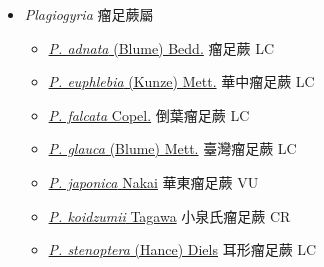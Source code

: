 
  \begin{itemize}
 \item[    ] \textit{Plagiogyria} 瘤足蕨屬
                                
  \begin{itemize}
        \item[] \href{http://www.theplantlist.org/tpl1.1/search?q=Plagiogyria+adnata}{\textit{P. adnata} (Blume) Bedd.}   瘤足蕨   LC
        \item[] \href{http://www.theplantlist.org/tpl1.1/search?q=Plagiogyria+euphlebia}{\textit{P. euphlebia} (Kunze) Mett.}   華中瘤足蕨   LC
        \item[] \href{http://www.theplantlist.org/tpl1.1/search?q=Plagiogyria+falcata}{\textit{P. falcata} Copel.}   倒葉瘤足蕨   LC
        \item[] \href{http://www.theplantlist.org/tpl1.1/search?q=Plagiogyria+glauca}{\textit{P. glauca} (Blume) Mett.}   臺灣瘤足蕨   LC
        \item[] \href{http://www.theplantlist.org/tpl1.1/search?q=Plagiogyria+japonica}{\textit{P. japonica} Nakai}   華東瘤足蕨   VU
        \item[] \href{http://www.theplantlist.org/tpl1.1/search?q=Plagiogyria+koidzumii}{\textit{P. koidzumii} Tagawa}   小泉氏瘤足蕨   CR
        \item[] \href{http://www.theplantlist.org/tpl1.1/search?q=Plagiogyria+stenoptera}{\textit{P. stenoptera} (Hance) Diels}   耳形瘤足蕨   LC
  \end{itemize}
  \end{itemize}
